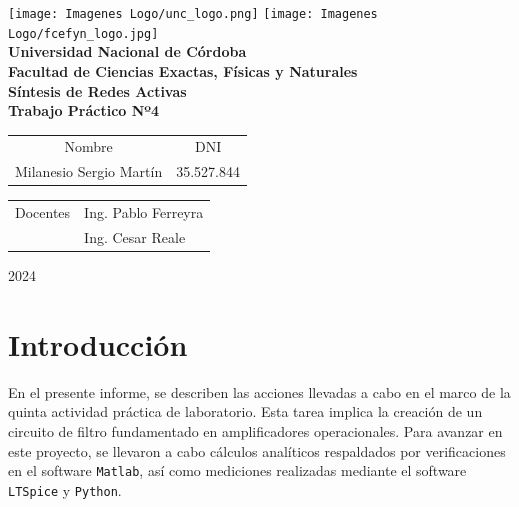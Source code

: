 \documentclass[12pt,A4paper,titlepage]{article}
\begin{document}
\begin{titlepage}

\thispagestyle{empty}


\begin{center}
    \texttt{[image: Imagenes Logo/unc\_logo.png]}
    \texttt{[image: Imagenes Logo/fcefyn\_logo.jpg]}
    \\[1cm]
    \vspace{5pt}
    \LARGE \textbf{Universidad Nacional de Córdoba}\\[0.5cm] 
    \large \textbf{Facultad de Ciencias Exactas, Físicas y Naturales} \\[0.5cm] 
    \large \textbf{Síntesis de Redes Activas}
    \\[0.5cm]
    \large \textbf{Trabajo Práctico Nº4}\\[0.5cm]
    \vspace{60pt}
    \begin{table}[!h]
    \centering
    \begin{tabular}{ll}
    \multicolumn{1}{c}{Nombre} & \multicolumn{1}{c}{DNI} \\
    Milanesio Sergio Martín & 35.527.844  \\
    
    \end{tabular}
    \end{table}
    \vspace{20pt}
    \begin{table}[!h]
    \centering
    \begin{tabular}{ll}
    \multicolumn{1}{c}{Docentes} & Ing. Pablo Ferreyra \\
     & Ing. Cesar Reale \\
     
    \end{tabular}
    \end{table}
    \vspace{20pt}
    \large 2024
\end{center}

\end{titlepage}

\newpage
\tableofcontents %

\newpage
\section{Introducción}
\hspace{1mm} En el presente informe, se describen las acciones llevadas a cabo en el marco de la quinta actividad práctica de laboratorio. Esta tarea implica la creación de un circuito de filtro fundamentado en amplificadores operacionales. Para avanzar en este proyecto, se llevaron a cabo cálculos analíticos respaldados por verificaciones en el software \texttt{Matlab}, así como mediciones realizadas mediante el software \texttt{LTSpice} y \texttt{Python}.
\end{document}
